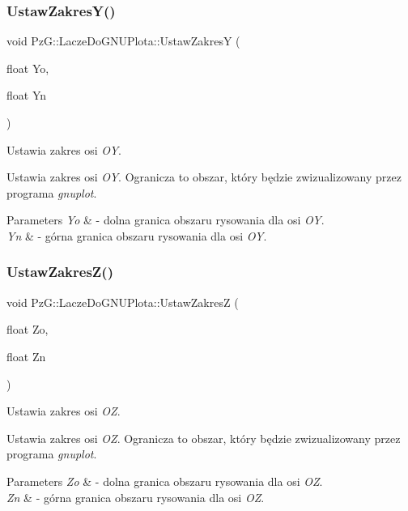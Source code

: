 \subsubsection{\texorpdfstring{Ustaw\+Zakres\+Y()}{UstawZakresY()}}
{\footnotesize\ttfamily void Pz\+G\+::\+Lacze\+Do\+G\+N\+U\+Plota\+::\+Ustaw\+ZakresY (\begin{DoxyParamCaption}\item[{float}]{Yo,  }\item[{float}]{Yn }\end{DoxyParamCaption})\hspace{0.3cm}{\ttfamily [inline]}}



Ustawia zakres osi {\itshape OY}. 

Ustawia zakres osi {\itshape OY}. Ogranicza to obszar, który będzie zwizualizowany przez programa {\itshape gnuplot}. 
\begin{DoxyParams}{Parameters}
{\em Yo} & -\/ dolna granica obszaru rysowania dla osi {\itshape OY}. \\
\hline
{\em Yn} & -\/ górna granica obszaru rysowania dla osi {\itshape OY}. \\
\hline
\end{DoxyParams}
\mbox{\label{classPzG_1_1LaczeDoGNUPlota_a1dbbb2b86fb13b8632e6bad9df2a82e3}} 
\subsubsection{\texorpdfstring{Ustaw\+Zakres\+Z()}{UstawZakresZ()}}
{\footnotesize\ttfamily void Pz\+G\+::\+Lacze\+Do\+G\+N\+U\+Plota\+::\+Ustaw\+ZakresZ (\begin{DoxyParamCaption}\item[{float}]{Zo,  }\item[{float}]{Zn }\end{DoxyParamCaption})\hspace{0.3cm}{\ttfamily [inline]}}



Ustawia zakres osi {\itshape OZ}. 

Ustawia zakres osi {\itshape OZ}. Ogranicza to obszar, który będzie zwizualizowany przez programa {\itshape gnuplot}. 
\begin{DoxyParams}{Parameters}
{\em Zo} & -\/ dolna granica obszaru rysowania dla osi {\itshape OZ}. \\
\hline
{\em Zn} & -\/ górna granica obszaru rysowania dla osi {\itshape OZ}. \\
\hline
\end{DoxyParams}
\mbox{\label{classPzG_1_1LaczeDoGNUPlota_a75f599f17413ea8602c6dbba09f36407}} 
